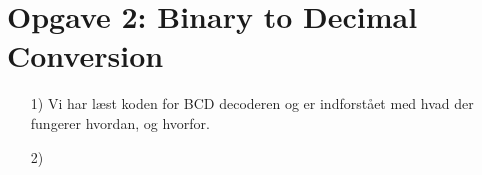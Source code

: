 \section{Opgave 2: Binary to Decimal Conversion}
\begin{enumerate}
	\item[1)]
	Vi har læst koden for BCD decoderen og er indforstået med hvad der fungerer hvordan, og hvorfor.
	
	\item[2)]
	
	
\end{enumerate}
